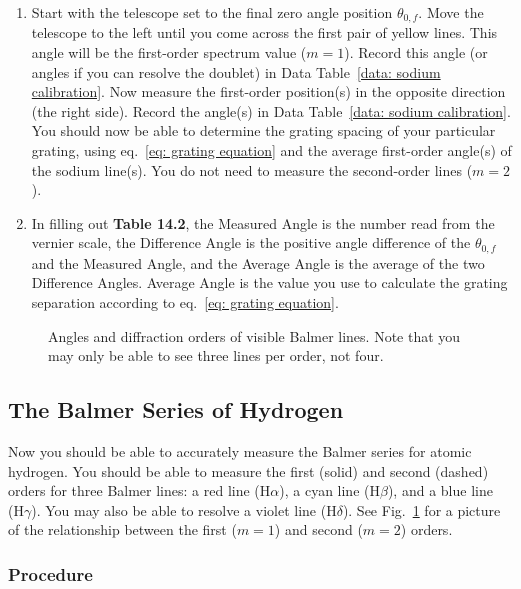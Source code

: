 \documentclass[addpoints]{physlabs}
\begin{document}
\begin{labsection}
\begin{experiment}
\begin{enumerate}
    \item Start with the telescope set to the final zero angle position $\theta_{0,f}$. Move the telescope to the left until you come across the first pair of yellow lines. This angle will be the first-order spectrum value ($m=1$). Record this angle (or angles if you can resolve the doublet) in Data Table~\ref{data: sodium calibration}. Now measure the first-order position(s) in the opposite direction (the right side). Record the angle(s) in Data Table~\ref{data: sodium calibration}. You should now be able to determine the grating spacing of your particular grating, using eq.~\ref{eq: grating equation} and the average first-order angle(s) of the sodium line(s). You do not need to measure the second-order lines ($m=2$).
    \item In filling out \textbf{Table 14.2}, the Measured Angle is the number read from the vernier scale, the Difference Angle is the positive angle difference of the $\theta_{0,f}$ and the Measured Angle, and the Average Angle is the average of the two Difference Angles. Average Angle is the value you use to calculate the grating separation according to eq.~\ref{eq: grating equation}.
\end{enumerate}

\begin{figure}[ht]
    \centering
    \scalebox{0.85}{}
    \caption{Angles and diffraction orders of visible Balmer lines. Note that you may only be able to see three lines per order, not four.}
    \label{fig: balmer lines}
\end{figure}

\subsection*{The Balmer Series of Hydrogen}

Now you should be able to accurately measure the Balmer series for atomic hydrogen. 
You should be able to measure the first (solid) and second (dashed) orders for three Balmer lines: a red line (H$\alpha$), a cyan line (H$\beta$), and a blue line (H$\gamma$). 
You may also be able to resolve a violet line (H$\delta$). 
See Fig.~\ref{fig: balmer lines} for a picture of the relationship between the first ($m=1$) and second ($m=2$) orders.

\subsubsection*{Procedure}


\end{experiment}
\end{labsection}
\end{document}
